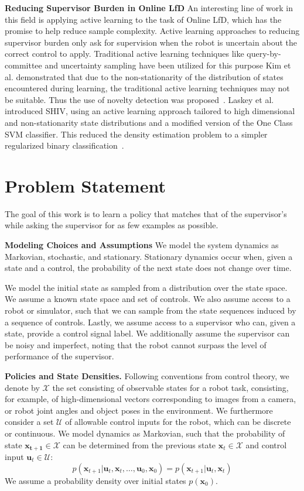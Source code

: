 \documentclass[10pt, conference]{ieeeconf}      %
\newcommand{\bu}{\mathbf{u}}
\newcommand{\bx}{\mathbf{x}}
\begin{document}
\noindent\textbf{Reducing Supervisor Burden in Online LfD} 
An interesting line of work in this field is applying active learning to the task of Online LfD, which has the promise to help reduce sample complexity. Active learning approaches to reducing supervisor burden only ask for supervision when the robot is uncertain about the
correct control to apply. Traditional active learning techniques like query-by-committee and uncertainty sampling have
been utilized for this purpose \cite{chernova2009interactive,judah2011active,grollman2007dogged}
Kim et al. demonstrated that due to the non-stationarity of the distribution of states encountered during
learning, the traditional active learning techniques may not be suitable.
Thus the use of novelty detection was proposed~\cite{kim2013maximum}. Laskey et al. introduced SHIV, using an active
learning approach tailored to high dimensional and non-stationarity state distributions and a modified version of the
One Class SVM classifier. This reduced the density estimation problem to a 
simpler regularized binary classification~\cite{laskeyshiv}. 


\section{Problem Statement}\label{sec:PS}
The goal of this work is to learn a policy that matches that of the supervisor's while asking the supervisor for as few examples as possible.

\noindent\textbf{Modeling Choices and Assumptions}  We model the system dynamics as Markovian, stochastic, and stationary. Stationary dynamics occur when, given a state and a control, the probability of the next state does not change over time. 

We model the initial state as sampled from a distribution over the state space.
We assume a known state space and set of controls. We also assume access to a robot or simulator, such that we  can sample from the state sequences induced by a sequence of controls.   Lastly, we assume access to a supervisor who can, given a state, provide a control signal label. We additionally assume the supervisor can be noisy and imperfect, noting that the robot cannot surpass the level of performance of the supervisor. 

\noindent\textbf{Policies and State Densities.}
Following conventions from control theory, we denote by $\mathcal{X}$ the set consisting of observable states for a robot task, consisting, for example, of 
high-dimensional vectors corresponding to images from a camera, or robot joint angles and object poses in the environment.
We furthermore consider a set $\mathcal{U}$ of allowable control inputs for the robot, which can be discrete or
continuous. We model dynamics as Markovian, such that the probability of state $\mathbf{x_{t+1}}\in
\mathcal{X}$ can be determined from the previous state $\mathbf{x}_t\in\mathcal{X}$ and control input $\mathbf{u}_t\in
\mathcal{U}$: 
$$p(\bx_{t+1}|\bu_{t},\bx_{t}, \ldots, \bu_{0}, \bx_{0})=p(\bx_{t+1}|\bu_{t}, \bx_t)$$
We assume a probability density over initial states $p(\bx_0)$.
\end{document}
